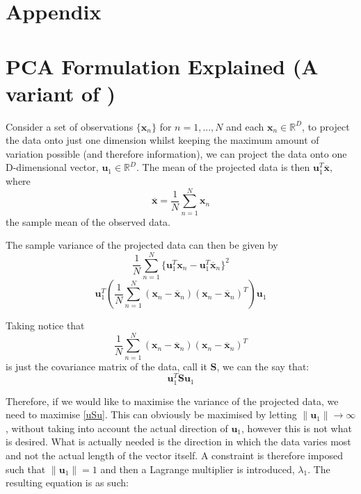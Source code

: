 \documentclass[11pt,a4paper]{article}
\begin{document}


\clearpage

\section{Appendix}\label{appendixa}

\appendix
{}

\section{PCA Formulation Explained (A variant of \cite{bishop})}

Consider a set of observations $\{\mathbf{x}_n\}$ for $n = 1, ..., N$ and each $\mathbf{x}_n \in \mathbb{R}^D$, to project the data onto just one dimension whilst keeping the maximum amount of variation possible (and therefore information), we can project the data onto one D-dimensional vector, $\mathbf{u}_1 \in \mathbb{R}^D$. The mean of the projected data is then $\mathbf{u}_1^T \mathbf{\overline{x}}$, where
\begin{equation*}
\mathbf{\overline{x}} = \frac{1}{N} \sum_{n = 1}^N \mathbf{x}_n 
\end{equation*} 
the sample mean of the observed data.

The sample variance of the projected data can then be given by
\begin{equation*}
\frac{1}{N} \sum_{n = 1}^N \{\mathbf{u}_1^T\mathbf{x}_n -  \mathbf{u}_1^T\mathbf{\overline{x}}_n\}^2
\end{equation*} 
\begin{equation*}
\mathbf{u}_1^T \left( \frac{1}{N} \sum_{n = 1}^N \left(\mathbf{x}_n - \mathbf{\overline{x}}_n\right)\left(\mathbf{x}_n - \mathbf{\overline{x}}_n\right)^T \right) \mathbf{u}_1
\end{equation*} 

Taking notice that 
\begin{equation*}
\frac{1}{N} \sum_{n = 1}^N \left(\mathbf{x}_n - \mathbf{\overline{x}}_n\right)\left(\mathbf{x}_n - \mathbf{\overline{x}}_n\right)^T 
\end{equation*} 
is just the covariance matrix of the data, call it $\mathbf{S}$, we can the say that:
\begin{equation}
\mathbf{u}_1^T \mathbf{S} \mathbf{u}_1
\label{uSu}
\end{equation} 

Therefore, if we would like to maximise the variance of the projected data, we need to maximise \eqref{uSu}. This can obviously be maximised by letting $\|\mathbf{u}_1\| \to \infty$, without taking into account the actual direction of $\mathbf{u}_1$, however this is not what is desired. What is actually needed is the direction in which the data varies most and not the actual length of the vector itself. A constraint is therefore imposed such that $\|\mathbf{u}_1\| = 1$ and then a Lagrange multiplier is introduced, $\lambda_1$. The resulting equation is as such:
\end{document}
